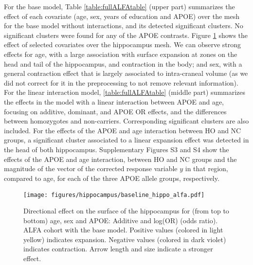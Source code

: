 For the base model, Table \ref{table:fullALFAtable} (upper part) summarizes the effect of each covariate (age, sex, years of education and APOE) over the mesh for the base model without interactions, and its detected significant clusters. No significant clusters were found for any of the APOE contrasts. Figure \ref{fig:alfabaselinefig1} shows the effect of selected covariates over the hippocampus mesh. We can observe strong effects for age, with a large association with surface expansion at zones on the head and tail of the hippocampus, and contraction in the body; and sex, with a general contraction effect that is largely associated to intra-craneal volume (as we did not correct for it in the preprocessing to not remove relevant information). For the linear interaction model, \ref{table:fullALFAtable} (middle part) summarizes the effects in the model with a linear interaction between APOE and age, focusing on additive, dominant, and APOE OR effects, and the differences between homozygotes and non-carriers. Corresponding significant clusters are also included. For the effects of the APOE and age interaction between HO and NC groups, a significant cluster associated to a linear expansion effect was detected in the head of both hippocampus. Supplementary Figures S3 and S4 show the effects of the APOE and age interaction, between HO and NC groups and the magnitude of the vector of the corrected response variable $y$ in that region, compared to age, for each of the three APOE allele groups, respectively.  \\

\begin{figure}[htbp]
  \centering
  \texttt{[image: figures/hippocampus/baseline\_hippo\_alfa.pdf]}
  \caption[Directional effect on the surface of the hippocampus, ALFA cohort.]{Directional effect on the surface of the hippocampus for (from top to bottom) age, sex and APOE: Additive and log(OR) (odds ratio). ALFA cohort with the base model. Positive values (colored in light yellow) indicates expansion. Negative values (colored in dark violet) indicates contraction. Arrow length and size indicate a stronger effect.}\label{fig:alfabaselinefig1}
\end{figure}

